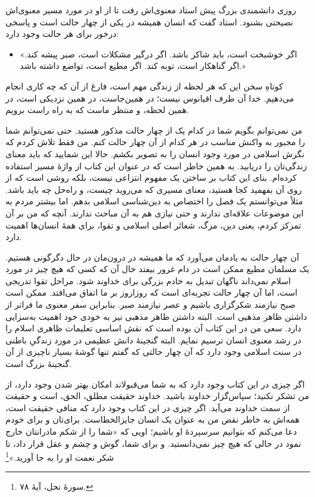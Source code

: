 روزی دانشمندی بزرگ پیش استاد معنوی‌اش رفت تا از او در مورد مسیر معنوی‌اش نصیحتی بشنود. استاد گفت که انسان همیشه در یکی از چهار حالت است و پاسخی درخور برای هر حالت وجود دارد:

\begin{itemize}
	\item[]
	«اگر خوشبخت است، باید شاکر باشد. اگر درگیر مشکلات است، صبر پیشه کند. اگر گناهکار است، توبه کند. اگر مطیع است، تواضع داشته باشد.»
\end{itemize}



کوتاهِ سخن این که هر لحظه‌ از زندگی مهم است، فارغ از آن که چه کاری انجام می‌دهیم. خدا آن طرف اقیانوس نیست؛ در همین‌جاست، در همین نزدیکی است، در همین لحظه، و منتظر ماست که به راه راست برویم.

من نمی‌توانم بگویم شما در کدام یک از چهار حالت مذکور هستید. حتی نمی‌توانم شما را مجبور به واکنش مناسب در هر کدام از آن چهار حالت کنم.  من فقط تلاش کردم که نگرش اسلامی در مورد وجود انسان را به تصویر بکشم. حالا این شمایید که باید معنای زندگی‌تان را دریابید. به همین خاطر است که  در عنوان این کتاب از واژهٔ مسیر استفاده کرده‌ام. بنای این کتاب بر ساختن یک مفهوم انتزاعی نیست، بلکه روشی است که از روی آن بفهمید کجا هستید، معنای مسیری که می‌روید چیست، و راه‌حل چه باید باشد. مثلاً می‌توانستم یک فصل را اختصاص به دین‌شناسی اسلامی بدهم. اما بیشتر مردم به این موضوعات علاقه‌ای ندارند و حتی نیازی هم به آن مباحث ندارند. آنچه که من بر آن تمرکز کردم، یعنی دین، مرگ، شعائر اصلی اسلامی و تقوا، برای همهٔ انسان‌ها اهمیت دارد.

آن چهار حالت به یادمان می‌آورد که ما همیشه در درون‌مان در حال دگرگونی هستیم. یک مسلمان مطیع ممکن است در دام غرور بیفتد حال آن که کسی که هیچ چیز در مورد اسلام نمی‌داند ناگهان تبدیل به خادم بزرگی برای خداوند شود. مراحل تقوا تدریجی است، اما آن چهار حالت تجربه‌ای است که روزاروز بر ما اتفاق می‌افتد. ممکن است صبح نیازمند شکرگزاری باشیم و عصر نیازمند صبر. بنابراین سفر معنوی ما فراتر از داشتن ظاهر مذهبی  است. البته داشتن ظاهر مذهبی نیز به خودی خود اهمیت به‌سزایی دارد. سعی من در این کتاب آن بوده است که نقش اساسی تعلیمات ظاهری اسلام را در رشد معنوی انسان ترسیم نمایم. البته گنجینهٔ دانش عظیمی در مورد زندگیِ باطنی در سنت اسلامی وجود دارد که آن چهار حالتی که گفتم تنها گوشهٔ بسیار ناچیزی از آن گنجینهٔ بزرگ است.

اگر چیزی در این کتاب وجود دارد که به شما می‌قبولاند امکان بهتر شدن وجود دارد، از من تشکر نکنید؛ سپاس‌گزار خداوند باشید. خداوند حقیقت مطلق، الحق، است و حقیقت از سمت خداوند می‌آید. اگر چیزی در این کتاب وجود دارد که منافی حقیقت است، همه‌اش به خاطر نقص من به عنوان یک انسان جایزالخطاست. برای‌تان و برای خودم دعا می‌کنم که بتوانیم سرسپردهٔ او باشیم؛ اویی که  «شما را از شکم مادرانتان خارج نمود در حالی که هیچ چیز نمی‌دانستید. و برای شما، گوش و چشم و عقل قرار داد، تا شکر نعمت او را به جا آورید.»\footnote{سورهٔ نحل، آیهٔ ۷۸.}

